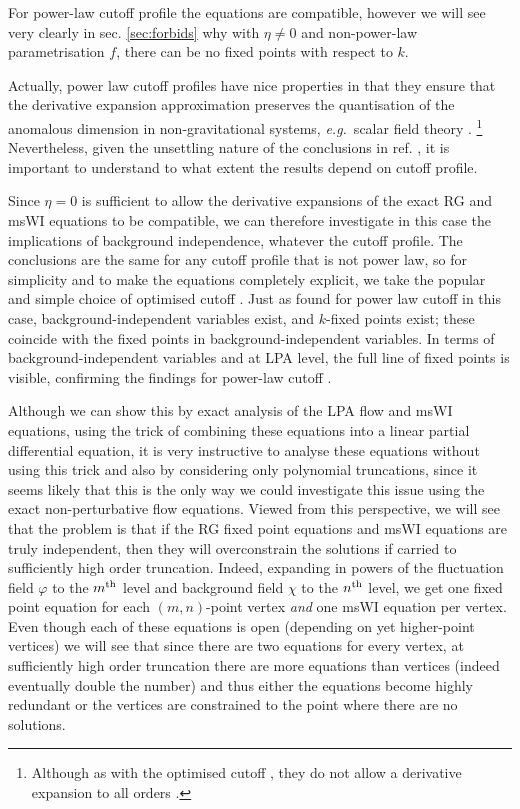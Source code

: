 \documentclass[11pt]{book} %
\newcommand\eg{\textit{e.g.}\ }
\newcommand{\vp}{\varphi}
\numberwithin{equation}{chapter}
\begin{document}
For power-law cutoff profile the equations are compatible, however we will see very
clearly in sec. \ref{sec:forbids} why with $\eta\ne0$ and non-power-law parametrisation $f$,
there can be no fixed points with respect to $k$.

Actually, power law cutoff profiles have nice properties in  that they ensure that the derivative
expansion approximation preserves the quantisation of the anomalous dimension in non-gravitational systems,
\eg scalar field theory \cite{Morris:1994ie, Morris:1994jc, Morris:1998da}.%
\footnote{Although as with the optimised cutoff \cite{Litim:2000ci, Litim:2001fd},
they do not allow a derivative expansion to all orders \cite{Morris:2005ck, Morris:1999ba, Morris:2000hm}.}
Nevertheless, given the unsettling nature of the conclusions in ref.
\cite{Dietz:2015owa}, it is important to understand  to what extent the results depend on cutoff profile.

Since $\eta=0$ is sufficient to allow the derivative expansions of the exact RG and msWI equations
to be compatible, we can therefore investigate in this case the implications of background independence,
whatever the cutoff profile. The conclusions are the same for any cutoff profile that is not power law,
so for simplicity and to make the equations completely explicit,
we take the popular and simple choice of optimised cutoff \cite{Litim:2000ci, Litim:2001fd}.
Just as found for power law cutoff \cite{Dietz:2016gzg} in this case, background-independent variables exist,
and $k$-fixed points exist; these coincide with the fixed points in background-independent variables.
In terms of background-independent variables and at LPA level, the full line of fixed points
is visible, confirming the findings for power-law cutoff \cite{Dietz:2016gzg}.

Although we can show this by exact analysis of the LPA flow and msWI equations,
using the trick of combining these equations into a linear partial differential equation,
it is very instructive to analyse these equations without using this trick and also by considering
only polynomial truncations, since it seems likely that this is the only way we could investigate this
issue using the exact non-perturbative flow equations. Viewed from this perspective,
we will see that the problem is that if the RG fixed point equations and msWI equations are truly independent,
then they will overconstrain the solutions if carried to sufficiently high order truncation.
Indeed, expanding in powers of the fluctuation field $\vp$ to the $m^{\rm th}$ level and
background field $\chi$ to the $n^{\rm th}$ level, we get one fixed point equation for
each $(m,n)$-point vertex \emph{and} one msWI equation per vertex.
Even though each of these equations is open (depending on yet higher-point vertices) we will
see that since there are two equations for every vertex, at sufficiently high order truncation there
are more equations than vertices (indeed eventually double the number) and thus either the equations
become highly redundant or the vertices are constrained to the point where there are no solutions.
\end{document}
